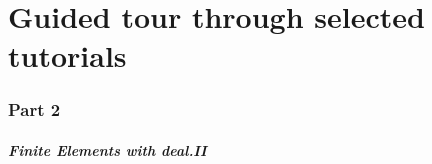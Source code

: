 \part{Guided tour through selected tutorials}

\section*{Part 2}
\begin{frame}
  \frametitle{Finite Elements with deal.II}
  \tableofcontents[hideallsubsections]

  \vfill

  \hyperlink{part1}{}
  \hypertarget{part2}{}
  \hyperlink{part3}{}
\end{frame}

%

%






%
%


